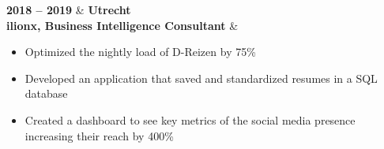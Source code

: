 \textbf{2018 – 2019} & \textbf{Utrecht} \\
\textbf{ilionx, Business Intelligence Consultant} \faExternalLink & 
\begin{itemize}[leftmargin=0.5cm,itemsep=0pt,parsep=0pt]
\item Optimized the nightly load of D-Reizen by 75\%
\item Developed an application that saved and standardized resumes in a SQL database
\item Created a dashboard to see key metrics of the social media presence increasing their reach by 400\%
\end{itemize} \\ 